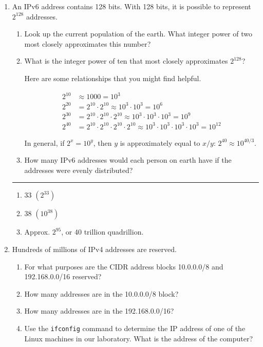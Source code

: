 \documentclass[twoside]{article}
\newenvironment{answer}
  {\vspace*{0.2cm} \rule{12cm}{0.04cm} \vspace*{0.2cm}}
  {\vspace*{0.2cm}}
\begin{document}
\begin{enumerate}
  \item An IPv6 address contains 128 bits. With 128 bits, it
    is possible to represent $2^{128}$ addresses.
  \begin{enumerate}
    \item Look up the current population of the earth. What integer
      power of two most closely approximates this number?
    \item What is the integer power of ten that most closely
      approximates $2^{128}$?

      Here are some relationships that you might find helpful.

      \begin{align*}
        2^{10} & \approx 1000 = 10^3 \\
        2^{20} & = 2^{10} \cdot 2^{10} \approx 10^3 \cdot 10^3 = 10^6 \\
        2^{30} & = 2^{10} \cdot 2^{10} \cdot 2^{10} \approx 10^3 \cdot 10^3 \cdot 10^3 = 10^9 \\
        2^{40} & = 2^{10} \cdot 2^{10} \cdot 2^{10} \cdot 2^{10} \approx
            10^3 \cdot 10^3 \cdot 10^3 \cdot 10^3 = 10^{12}
        \end{align*}

      In general, if $2^x = 10^y$, then $y$ is approximately equal to $x/y$: $2^{40} \approx 10^{40/3}$.
      
    \item How many IPv6 addresses would each person on earth have if the addresses
      were evenly distributed?
    \end{enumerate}

  \begin{answer}

  \begin{enumerate}
    \item 33 $(2^33)$
    \item 38 $(10^38)$
    \item Approx. $2^95$, or 40 trillion quadrillion.
    \end{enumerate}

    \end{answer}

  \item Hundreds of millions of IPv4 addresses are reserved.
  \begin{enumerate}
    \item For what purposes are the CIDR address blocks 10.0.0.0/8 and 192.168.0.0/16 reserved?
    \item How many addresses are in the 10.0.0.0/8 block?
    \item How many addresses are in the 192.168.0.0/16?
    \item Use the \verb+ifconfig+ command to determine the IP address of
      one of the Linux machines in our laboratory. What is the address of the computer?
    \end{enumerate}


\end{enumerate}
\end{document}
